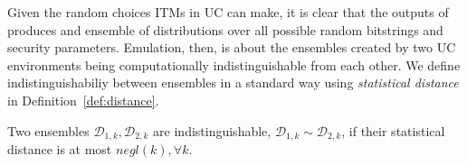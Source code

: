 Given the random choices ITMs in UC can make, it is clear that the outputs of  produces and ensemble of distributions over all possible random bitstrings and security parameters.
Emulation, then, is about the ensembles created by two UC environments being computationally indistinguishable from each other.
We define indistinguishabiliy between ensembles in a standard way using \textit{statistical distance} in Definition~\ref{def:distance}.

\begin{definition}[Indisinguishability]\label{def:distance}
Two ensembles $\mathcal{D}_{1,k}, \mathcal{D}_{2,k}$ are indistinguishable, $\mathcal{D}_{1,k} \sim \mathcal{D}_{2,k}$, if their statistical distance is at most $negl(k), \forall k$.
\end{definition}


